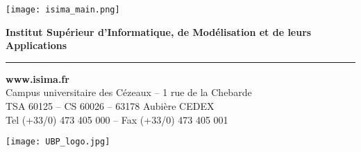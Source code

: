 \begin{titlepage}
  \vfill

  \begin{minipage}[c]{0.10\textwidth}
    \vfill
    \texttt{[image: isima\_main.png]}
    \vfill \null
  \end{minipage}
  \begin{minipage}[b]{0.89\textwidth}
    \textbf{Institut Supérieur d'Informatique, de Modélisation et de leurs Applications}
    \vskip1mm
    {\color{NavyBlue}\hrule}
    \vskip3mm
    \begin{minipage}{0.78\textwidth}
      \textcolor{NavyBlue}{\large\textbf{www.isima.fr}}\\
      Campus universitaire des Cézeaux -- 1 rue de la Chebarde\\
      TSA 60125 -- CS 60026 -- 63178 Aubière CEDEX\\
      Tel (+33/0) 473 405 000 -- Fax (+33/0) 473 405 001
    \end{minipage}
    \hfill
    \begin{minipage}{0.20\textwidth}
      \raggedleft
      \texttt{[image: UBP\_logo.jpg]}
    \end{minipage}
  \end{minipage} 

\end{titlepage}
\makeatother